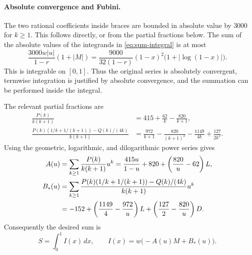 \documentclass[11pt,a4paper]{article}
\numberwithin{equation}{section}
\begin{document}
\paragraph{Absolute convergence and Fubini.}
The two rational coefficients inside braces are bounded in absolute value by $3000$ for $k\ge1$. This follows directly, or from the partial fractions below. The sum of the absolute values of the integrands in \eqref{eq:sum-integral} is at most
\begin{equation}\label{eq:majorant}
 \frac{3000w|u|}{1-r}(1+|M|)
 =\frac{9000}{32(1-r)}(1-x)^2\bigl(1+|\log(1-x)|\bigr).
\end{equation}
This is integrable on $[0,1]$. Thus the original series is absolutely convergent, termwise integration is justified by absolute convergence, and the summation can be performed inside the integral.

The relevant partial fractions are
\begin{align}
 \frac{P(k)}{k(k+1)}&=415+\frac{62}{k}-\frac{820}{k+1},\label{eq:pf1}\\
 \frac{P(k)(1/k+1/(k+1))-Q(k)/(4k)}{k(k+1)}
 &=\frac{972}{k+1}-\frac{820}{(k+1)^2}
   -\frac{1149}{4k}+\frac{127}{2k^2}.
 \label{eq:pf2}
\end{align}
Using the geometric, logarithmic, and dilogarithmic power series gives
\begin{align}
 A(u)&=\sum_{k\ge1}\frac{P(k)}{k(k+1)}u^k
 =\frac{415u}{1-u}+820+\left(\frac{820}{u}-62\right)L,
 \label{eq:A}\\
 B_*(u)&=\sum_{k\ge1}
 \frac{P(k)(1/k+1/(k+1))-Q(k)/(4k)}{k(k+1)}u^k\notag\\
 &=-152+\left(\frac{1149}{4}-\frac{972}{u}\right)L
         +\left(\frac{127}{2}-\frac{820}{u}\right)D.
 \label{eq:B}
\end{align}
Consequently the desired sum is
\begin{equation}\label{eq:integrand}
 S=\int_0^1 I(x)\,dx,\qquad
 I(x)=w\bigl(-A(u)M+B_*(u)\bigr).
\end{equation}
\end{document}

